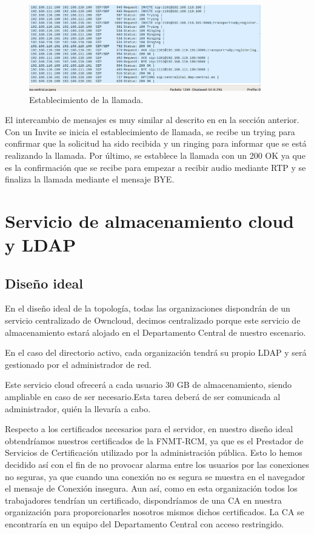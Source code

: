 \documentclass[a4paper]{article}
\begin{document}
\begin{figure}[htb]
    \begin{center}
        \includegraphics[width=0.9\textwidth]{invite1112-1101.png}
        \caption{Establecimiento de la llamada.}
         \label{fig:aut2}
    \end{center}
\end{figure}

El intercambio de mensajes es muy similar al descrito en en la sección anterior. Con un Invite se inicia el establecimiento de llamada, se recibe un trying para confirmar que la solicitud ha sido recibida y un ringing para informar que se está realizando la llamada. Por último, se establece la llamada con un 200 OK ya que es la confirmación que se recibe para empezar a recibir audio mediante RTP y se finaliza la llamada mediante el mensaje BYE.

\newpage

\section{Servicio de almacenamiento cloud y LDAP}
\subsection{Diseño ideal}
En el diseño ideal de la topología, todas las organizaciones dispondrán de un servicio centralizado de Owncloud, decimos centralizado porque este servicio de almacenamiento estará alojado en el Departamento Central de nuestro escenario.

En el caso del directorio activo, cada organización tendrá su propio LDAP y será gestionado por el administrador de red.

Este servicio cloud ofrecerá a cada usuario 30 GB de almacenamiento, siendo
ampliable en caso de ser necesario.Esta tarea deberá de ser comunicada al administrador,
quién la llevaría a cabo.

Respecto a los certificados necesarios para el servidor, en nuestro diseño ideal
obtendríamos nuestros certificados de la FNMT-RCM, ya que es el Prestador de Servicios de Certificación utilizado por la administración pública. Esto lo hemos decidido así con el fin de no provocar alarma entre los usuarios por las conexiones no seguras, ya que cuando una conexión no es segura se muestra en el navegador el mensaje de Conexión insegura. Aun así, como en
esta organización todos los trabajadores tendrían un certificado,  dispondríamos de una CA en nuestra organización para proporcionarles nosotros mismos dichos certificados. La CA se encontraría en un equipo del Departamento Central con acceso restringido.
\end{document}
